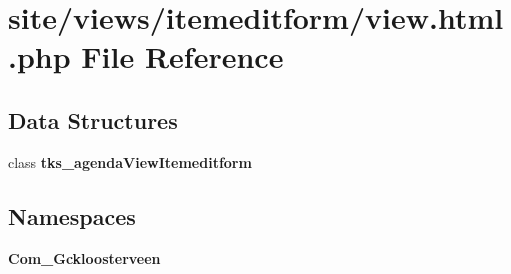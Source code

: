 \section{site/views/itemeditform/view.html.\+php File Reference}
\label{site_2views_2itemeditform_2view_8html_8php}
\subsection*{Data Structures}
\begin{DoxyCompactItemize}
\item 
class \textbf{ tks\+\_\+agenda\+View\+Itemeditform}
\end{DoxyCompactItemize}
\subsection*{Namespaces}
\begin{DoxyCompactItemize}
\item 
 \textbf{ Com\+\_\+\+Gckloosterveen}
\end{DoxyCompactItemize}
